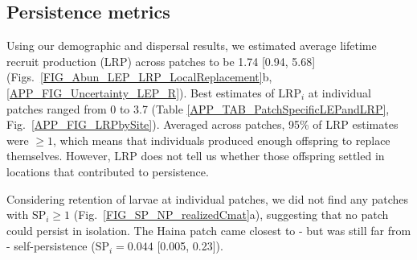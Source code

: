 \documentclass[12pt, oneside]{article}   	%
\begin{document}
\subsection*{Persistence metrics}

Using our demographic and dispersal results, we estimated average lifetime recruit production (LRP) across patches to be 1.74 [0.94, 5.68] (Figs.\ \ref{FIG_Abun_LEP_LRP_LocalReplacement}b, \ref{APP_FIG_Uncertainty_LEP_R}). Best estimates of $\text{LRP}_i$ at individual patches ranged from 0 to 3.7 (Table \ref{APP_TAB_PatchSpecificLEPandLRP}, Fig.\ \ref{APP_FIG_LRPbySite}). Averaged across patches, 95\% of LRP estimates were $\geq 1$, which means that individuals produced enough offspring to replace themselves. However, LRP does not tell us whether those offspring settled in locations that contributed to persistence.


Considering retention of larvae at individual patches, we did not find any patches with $\text{SP}_{i} \geq 1$ (Fig.\ \ref{FIG_SP_NP_realizedCmat}a), suggesting that no patch could persist in isolation. The Haina patch came closest to - but was still far from - self-persistence ($\text{SP}_i = 0.044$ [0.005, 0.23]). %

\end{document}
